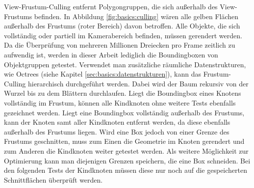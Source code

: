 View-Frustum-Culling entfernt Polygongruppen, die sich außerhalb des View-Frustums befinden. In Abbildung \ref{fig:basics:culling} wären alle gelben Flächen außerhalb des Frustums (roter Bereich) davon betroffen. Alle Objekte, die sich vollständig oder partiell im Kamerabereich befinden, müssen gerendert werden. Da die Überprüfung von mehreren Millionen Dreiecken pro Frame zeitlich zu aufwendig ist, werden in dieser Arbeit lediglich die Boundingboxen von Objektgruppen getestet. Verwendet man zusätzliche räumliche Datenstrukturen, wie Octrees (siehe Kapitel \ref{sec:basics:datenstrukturen}), kann das Frustum-Culling hierarchisch durchgeführt werden. Dabei wird der Baum rekursiv von der Wurzel bis zu dem Blättern durchlaufen. Liegt die Boundingbox eines Knotens vollständig im Frustum, können alle Kindknoten ohne weitere Tests ebenfalls gezeichnet werden. Liegt eine Boundingbox vollständig außerhalb des Frustums, kann der Knoten samt aller Kindknoten entfernt werden, da diese ebenfalls außerhalb des Frustums liegen. Wird eine Box jedoch von einer Grenze des Frustums geschnitten, muss zum Einen die Geometrie im Knoten gerendert und zum Anderen die Kindknoten weiter getestet werden. Als weitere Möglichkeit zur Optimierung kann man diejenigen Grenzen speichern, die eine Box schneiden. Bei den folgenden Tests der Kindknoten müssen diese nur noch auf die gespeicherten Schnittflächen überprüft werden.\\

